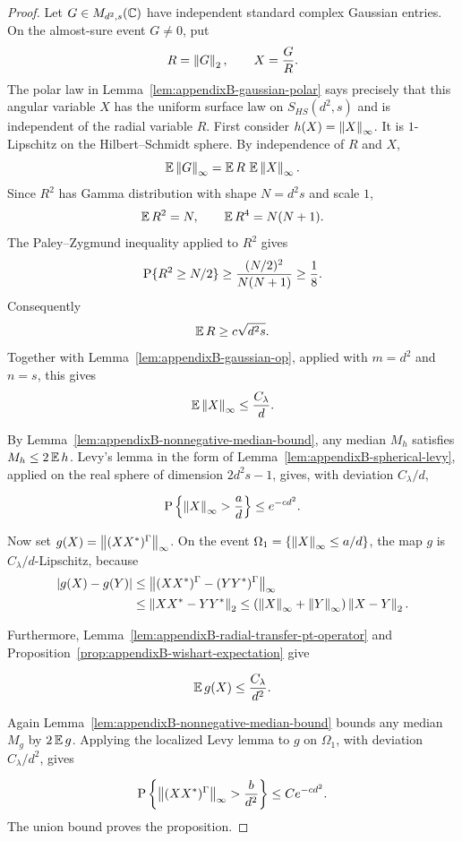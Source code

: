 \begin{proof}
Let \(G\in M_{d^2,s}(\mathbb{C})\) have independent standard complex Gaussian
entries.  On the almost-sure event \(G\ne0\), put
\[
  R=\left\lVert G\right\rVert_2,\qquad X=\frac GR .
\]
The polar law in Lemma~\ref{lem:appendixB-gaussian-polar} says precisely that
this angular variable \(X\) has the uniform surface law on \(S_{HS}(d^2,s)\)
and is independent of the radial variable \(R\).
First consider \(h(X)=\left\lVert X\right\rVert_\infty\).  It is \(1\)-Lipschitz on the
Hilbert--Schmidt sphere.  By independence of \(R\) and \(X\),
\[
  \operatorname{\mathbb{E}}\left\lVert G\right\rVert_\infty=\operatorname{\mathbb{E}} R\,\operatorname{\mathbb{E}}\left\lVert X\right\rVert_\infty.
\]
Since \(R^2\) has Gamma distribution with shape \(N=d^2s\) and scale \(1\),
\[
  \operatorname{\mathbb{E}} R^2=N,\qquad \operatorname{\mathbb{E}} R^4=N(N+1).
\]
The Paley--Zygmund inequality applied to \(R^2\) gives
\[
  \operatorname{P}\{R^2\ge N/2\}
  \ge
  \frac{(N/2)^2}{N(N+1)}
  \ge \frac18 .
\]
Consequently
\[
  \operatorname{\mathbb{E}} R\ge c\sqrt{d^2s}.
\]
Together with Lemma~\ref{lem:appendixB-gaussian-op}, applied with
\(m=d^2\) and \(n=s\), this gives
\[
  \operatorname{\mathbb{E}}\left\lVert X\right\rVert_\infty\le \frac{C_\lambda}{d}.
\]
\begin{revlatest}
By Lemma~\ref{lem:appendixB-nonnegative-median-bound}, any median \(M_h\)
satisfies \(M_h\le2\operatorname{\mathbb{E}} h\).  Levy's lemma in the form of
Lemma~\ref{lem:appendixB-spherical-levy}, applied on the real sphere of
dimension \(2d^2s-1\), gives, with deviation \(C_\lambda/d\),
\end{revlatest}
\[
  \operatorname{P}\left\{\left\lVert X\right\rVert_\infty>\frac a d\right\}\le e^{-c d^2}.
\]

Now set \(g(X)=\left\lVert(XX^*)^\Gamma\right\rVert_\infty\).  On the event
\(\Omega_1=\{\left\lVert X\right\rVert_\infty\le a/d\}\), the map \(g\) is
\(C_\lambda/d\)-Lipschitz, because
\[
\begin{aligned}
 |g(X)-g(Y)|
 &\le
 \left\lVert(XX^*)^\Gamma-(YY^*)^\Gamma\right\rVert_\infty        \\
 &\le
 \left\lVert XX^*-YY^*\right\rVert_2
 \le
 (\left\lVert X\right\rVert_\infty+\left\lVert Y\right\rVert_\infty)\left\lVert X-Y\right\rVert_2 .
\end{aligned}
\]
\begin{revlatest}
Furthermore, Lemma~\ref{lem:appendixB-radial-transfer-pt-operator} and
Proposition~\ref{prop:appendixB-wishart-expectation} give
\end{revlatest}
\[
  \operatorname{\mathbb{E}} g(X)
  \le
  \frac{C_\lambda}{d^2}.
\]
\begin{revlatest}
Again Lemma~\ref{lem:appendixB-nonnegative-median-bound} bounds any median
\(M_g\) by \(2\operatorname{\mathbb{E}} g\).  Applying the localized Levy lemma to \(g\) on
\(\Omega_1\), with deviation \(C_\lambda/d^2\), gives
\end{revlatest}
\[
  \operatorname{P}\left\{
    \left\lVert(XX^*)^\Gamma\right\rVert_\infty>\frac b{d^2}
  \right\}
  \le
  C e^{-c d^2}.
\]
The union bound proves the proposition.
\end{proof}

